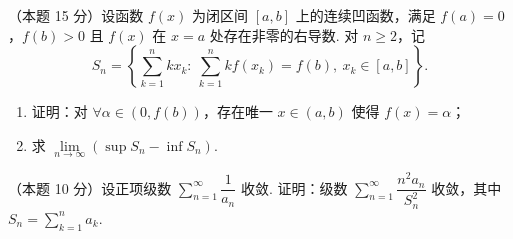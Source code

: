 \begin{problems}
\item[六、]（本题 15 分）设函数 $f(x)$ 为闭区间 $[a,b]$ 上的连续凹函数，满足 $f(a)=0$，$f(b)>0$ 且 $f(x)$ 在 $x=a$ 处存在非零的右导数. 对 $n\ge 2$，记
\[
  S_n=\left\{\sum_{k=1}^{n}kx_k:\ \sum_{k=1}^{n}kf(x_k)=f(b),\ x_k\in[a,b]\right\}.
\]
\begin{enumerate}
  \item 证明：对 $\forall\alpha\in(0,f(b))$，存在唯一 $x\in(a,b)$ 使得 $f(x)=\alpha$；
  \item 求 $\lim\limits_{n\to\infty}(\sup S_n-\inf S_n)$.
\end{enumerate}

\item[七、]（本题 10 分）设正项级数 $\sum\limits_{n=1}^{\infty}\dfrac{1}{a_n}$ 收敛. 证明：级数 $\sum\limits_{n=1}^{\infty}\dfrac{n^2a_n}{S_n^2}$ 收敛，其中 $S_n=\sum\limits_{k=1}^{n}a_k$.

\end{problems}
